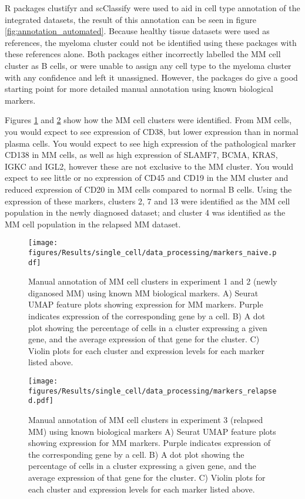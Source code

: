R packages clustifyr and scClassify were used to aid in cell type annotation of the integrated datasets, the result of this annotation can be seen in figure \ref{fig:annotation_automated}.
Because healthy tissue datasets were used as references, the myeloma cluster could not be identified using these packages with these references alone.
Both packages either incorrectly labelled the MM cell cluster as B cells, or were unable to assign any cell type to the myeloma cluster with any confidence and left it unassigned.
However, the packages do give a good starting point for more detailed manual annotation using known biological markers.


Figures \ref{fig:mm_markers_naive} and \ref{fig:mm_markers_relapsed} show how the MM cell clusters were identified.
From MM cells, you would expect to see expression of CD38, but lower expression than in normal plasma cells.
You would expect to see high expression of the pathological marker CD138 in MM cells, as well as high expression of SLAMF7, BCMA, KRAS, IGKC and IGL2, however these are not exclusive to the MM cluster.
You would expect to see little or no expression of CD45 and CD19 in the MM cluster and reduced expression of CD20 in MM cells compared to normal B cells.
Using the expression of these markers, clusters 2, 7 and 13 were identified as the MM cell population in the newly diagnosed dataset; and cluster 4 was identified as the MM cell population in the relapsed MM dataset.


\begin{figure}[p]
    \centering
    \texttt{[image: figures/Results/single\_cell/data\_processing/markers\_naive.pdf]}
    \caption[MM cluster manual annotation- newly diagnosed MM]{Manual annotation of MM cell clusters in experiment 1 and 2 (newly diganosed MM) using known MM biological markers.
    A) Seurat UMAP feature plots showing expression for MM markers.
    Purple indicates expression of the corresponding gene by a cell.
    B) A dot plot showing the percentage of cells in a cluster expressing a given gene, and the average expression of that gene for the cluster.
    C) Violin plots for each cluster and expression levels for each marker listed above.  }
    \label{fig:mm_markers_naive}
\end{figure}

\begin{figure}[p]
    \centering
    \texttt{[image: figures/Results/single\_cell/data\_processing/markers\_relapsed.pdf]}
    \caption[MM cluster manual annotation- relapsed MM]{Manual annotation of MM cell clusters in experiment 3 (relapsed MM) using known biological markers
    A) Seurat UMAP feature plots showing expression for MM markers.
    Purple indicates expression of the corresponding gene by a cell.
    B) A dot plot showing the percentage of cells in a cluster expressing a given gene, and the average expression of that gene for the cluster.
    C) Violin plots for each cluster and expression levels for each marker listed above. }
    \label{fig:mm_markers_relapsed}
\end{figure}



